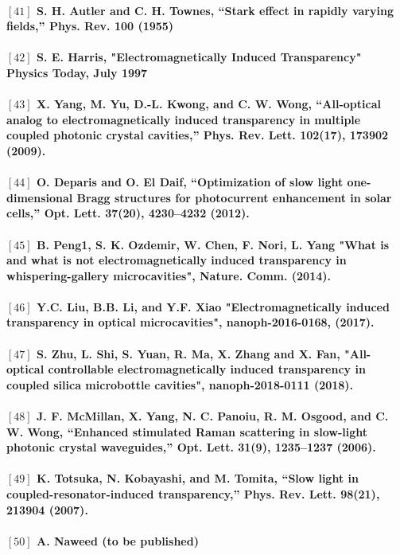 \paragraph{\normalfont \large $[41]$ S. H. Autler and C. H. Townes, “Stark effect in rapidly varying fields,” Phys. Rev. \textbf{100} (1955) \\ 
\\$[42]$ S. E. Harris, "Electromagnetically Induced Transparency" Physics Today, July 1997 \\
\\$[43]$ X. Yang, M. Yu, D.-L. Kwong, and C. W. Wong, “All-optical analog to electromagnetically induced
transparency in multiple coupled photonic crystal cavities,” Phys. Rev. Lett. \textbf{102}(17), 173902 (2009). \\
\\$[44]$  O. Deparis and O. El Daif, “Optimization of slow light one-dimensional Bragg structures for photocurrent
enhancement in solar cells,” Opt. Lett. \textbf{37}(20), 4230–4232 (2012).\\
\\ $[45]$ B. Peng1, S. K. Ozdemir, W. Chen, F. Nori, L. Yang "What is and what is not electromagnetically induced transparency in whispering-gallery microcavities", Nature. Comm. (2014).\\
\\ $[46]$ Y.C. Liu, B.B. Li, and Y.F. Xiao "Electromagnetically induced transparency in optical microcavities", nanoph-2016-0168, (2017).\\
\\ $[47]$ S. Zhu, L. Shi, S. Yuan, R. Ma, X. Zhang and X. Fan, "All-optical controllable electromagnetically induced transparency in coupled silica microbottle cavities", nanoph-2018-0111 (2018).\\
\\ $[48]$ J. F. McMillan, X. Yang, N. C. Panoiu, R. M. Osgood, and C. W. Wong, “Enhanced stimulated Raman scattering
in slow-light photonic crystal waveguides,” Opt. Lett. \textbf{31}(9), 1235–1237 (2006).\\
\\ $[49]$ K. Totsuka, N. Kobayashi, and M. Tomita, “Slow light in coupled-resonator-induced transparency,” Phys. Rev.
Lett. \textbf{98}(21), 213904 (2007).\\
\\ $[50]$ A. Naweed (to be published)}

